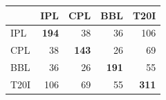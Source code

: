 \begin{tabular}{lrrrr}
\toprule
 & IPL & CPL & BBL & T20I \\
\midrule
IPL & \textbf{194} & 38 & 36 & 106 \\
CPL & 38 & \textbf{143} & 26 & 69 \\
BBL & 36 & 26 & \textbf{191} & 55 \\
T20I & 106 & 69 & 55 & \textbf{311} \\
\bottomrule
\end{tabular}